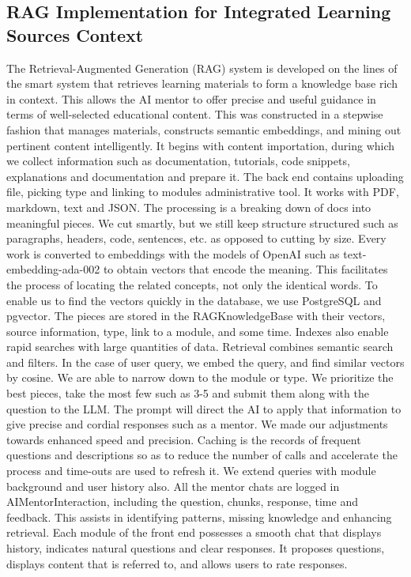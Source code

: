 \documentclass{FastFyp}
\begin{document}
\subsection{RAG Implementation for Integrated Learning Sources Context}
The Retrieval-Augmented Generation (RAG) system is developed on the lines of the smart system that retrieves learning materials to form a knowledge base rich in context. This allows the AI mentor to offer precise and useful guidance in terms of well-selected educational content. This was constructed in a stepwise fashion that manages materials, constructs semantic embeddings, and mining out pertinent content intelligently.
It begins with content importation, during which we collect information such as documentation, tutorials, code snippets, explanations and documentation and prepare it. The back end contains uploading file, picking type and linking to modules administrative tool. It works with PDF, markdown, text and JSON.
The processing is a breaking down of docs into meaningful pieces. We cut smartly, but we still keep structure structured such as paragraphs, headers, code, sentences, etc. as opposed to cutting by size.
Every work is converted to embeddings with the models of OpenAI such as text-embedding-ada-002 to obtain vectors that encode the meaning. This facilitates the process of locating the related concepts, not only the identical words.
To enable us to find the vectors quickly in the database, we use PostgreSQL and pgvector. The pieces are stored in the RAGKnowledgeBase with their vectors, source information, type, link to a module, and some time. Indexes also enable rapid searches with large quantities of data.
Retrieval combines semantic search and filters. In the case of user query, we embed the query, and find similar vectors by cosine. We are able to narrow down to the module or type.
We prioritize the best pieces, take the most few such as 3-5 and submit them along with the question to the LLM. The prompt will direct the AI to apply that information to give precise and cordial responses such as a mentor.
We made our adjustments towards enhanced speed and precision. Caching is the records of frequent questions and descriptions so as to reduce the number of calls and accelerate the process and time-outs are used to refresh it. We extend queries with module background and user history also.
All the mentor chats are logged in AIMentorInteraction, including the question, chunks, response, time and feedback. This assists in identifying patterns, missing knowledge and enhancing retrieval.
Each module of the front end possesses a smooth chat that displays history, indicates natural questions and clear responses. It proposes questions, displays content that is referred to, and allows users to rate responses.
\end{document}
